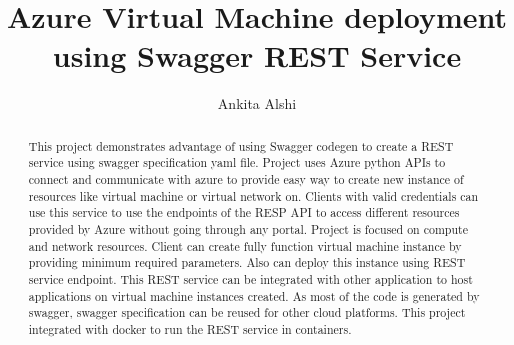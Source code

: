 
\title{Azure Virtual Machine deployment using Swagger REST Service}


\author{Ankita Alshi}


\renewcommand{\shortauthors}{Ankita Alshi}

\begin{abstract}
This project demonstrates advantage of using Swagger codegen to create a REST
service using swagger specification yaml file. Project uses Azure python APIs
to connect and communicate with azure to provide easy way to create new
instance of resources like virtual machine or virtual network on. Clients with
valid credentials can use this service to use the endpoints of the RESP API to
access different resources provided by Azure without going through any portal.
Project is focused on compute and network resources. Client can create fully
function virtual machine instance by providing minimum required parameters.
Also can deploy this instance using REST service endpoint. This REST service
can be integrated with other application to host applications on virtual
machine instances created. As most of the code is generated by swagger,
swagger specification can be reused for other cloud platforms. This project
integrated with docker to run the REST service in containers.

\end{abstract}



\maketitle

